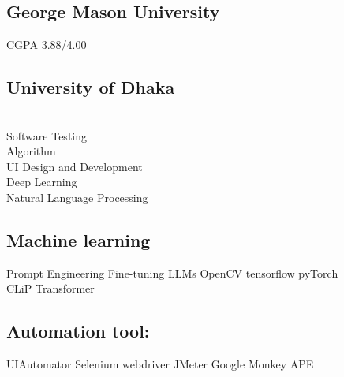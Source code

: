 \documentclass[a4paper]{MagicalCV}
\begin{document}



\begin{minipage}[t]{0.30\textwidth} 


\subsection{George Mason University}
CGPA 3.88/4.00

\sectionsep

\subsection{University of Dhaka}
\sectionsep


 \\
Software Testing\\
Algorithm \\
UI Design and Development\\
Deep Learning \\
Natural Language Processing \\
\sectionsep

\subsection{Machine learning}
Prompt Engineering \textbullet{} Fine-tuning LLMs
\textbullet{} OpenCV \textbullet{} tensorflow \textbullet{} pyTorch \textbullet{} \\ CLiP \textbullet{} Transformer \\

\subsection{Automation tool:}
UIAutomator \textbullet{} Selenium webdriver \textbullet{} JMeter \textbullet{} Google Monkey \textbullet{} APE 


\end{minipage}
\end{document}
